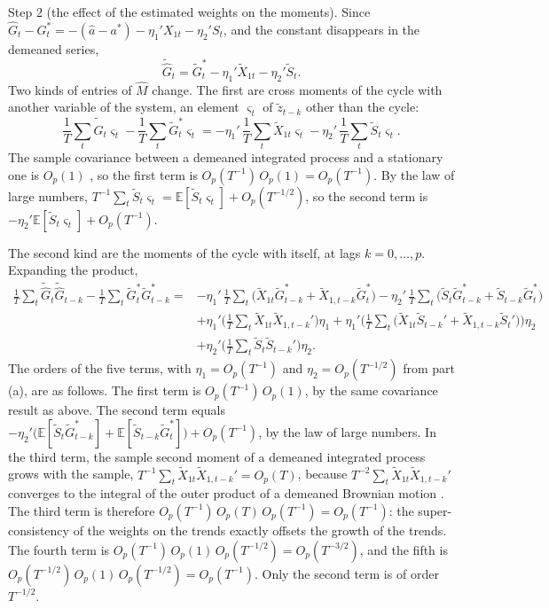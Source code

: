 \documentclass[12pt,a4paper]{article}
\theoremstyle{definition}
\theoremstyle{definition}\newtheorem{example}{Example}
\theoremstyle{definition}\newtheorem{definition}{Definition}
\newcommand{\E}{\mathbb{E}}
\begin{document}
Step 2 (the effect of the estimated weights on the moments). Since $\hat G_t-G^\ast_t=-(\hat a-a^\ast)-\eta_1'X_{1t}-\eta_2'S_t$, and the constant disappears in the demeaned series,
\[
\tilde{\hat G}_t=\tilde G^\ast_t-\eta_1'\tilde X_{1t}-\eta_2'\tilde S_t .
\]
Two kinds of entries of $\hat M$ change. The first are cross moments of the cycle with another variable of the system, an element $\varsigma_t$ of $\tilde z_{t-k}$ other than the cycle:
\[
\frac1T\sum_t\tilde{\hat G}_t\varsigma_t-\frac1T\sum_t\tilde G^\ast_t\varsigma_t=-\eta_1'\,\frac1T\sum_t\tilde X_{1t}\varsigma_t-\eta_2'\,\frac1T\sum_t\tilde S_t\varsigma_t .
\]
The sample covariance between a demeaned integrated process and a stationary one is $O_p(1)$ \citep{Phillips1988}, so the first term is $O_p(T^{-1})\,O_p(1)=O_p(T^{-1})$. By the law of large numbers, $T^{-1}\sum_t\tilde S_t\varsigma_t=\E[\tilde S_t\varsigma_t]+O_p(T^{-1/2})$, so the second term is $-\eta_2'\E[\tilde S_t\varsigma_t]+O_p(T^{-1})$.

The second kind are the moments of the cycle with itself, at lags $k=0,\dots,p$. Expanding the product,
\begin{align*}
\frac1T\sum_t\tilde{\hat G}_t\tilde{\hat G}_{t-k}-\frac1T\sum_t\tilde G^\ast_t\tilde G^\ast_{t-k}
={}&-\eta_1'\,\frac1T\sum_t\big(\tilde X_{1t}\tilde G^\ast_{t-k}+\tilde X_{1,t-k}\tilde G^\ast_t\big)
-\eta_2'\,\frac1T\sum_t\big(\tilde S_t\tilde G^\ast_{t-k}+\tilde S_{t-k}\tilde G^\ast_t\big)\\
&+\eta_1'\Big(\frac1T\sum_t\tilde X_{1t}\tilde X_{1,t-k}'\Big)\eta_1
+\eta_1'\Big(\frac1T\sum_t\big(\tilde X_{1t}\tilde S_{t-k}'+\tilde X_{1,t-k}\tilde S_t'\big)\Big)\eta_2\\
&+\eta_2'\Big(\frac1T\sum_t\tilde S_t\tilde S_{t-k}'\Big)\eta_2 .
\end{align*}
The orders of the five terms, with $\eta_1=O_p(T^{-1})$ and $\eta_2=O_p(T^{-1/2})$ from part (a), are as follows. The first term is $O_p(T^{-1})\,O_p(1)$, by the same covariance result as above. The second term equals $-\eta_2'\big(\E[\tilde S_t\tilde G^\ast_{t-k}]+\E[\tilde S_{t-k}\tilde G^\ast_t]\big)+O_p(T^{-1})$, by the law of large numbers. In the third term, the sample second moment of a demeaned integrated process grows with the sample, $T^{-1}\sum_t\tilde X_{1t}\tilde X_{1,t-k}'=O_p(T)$, because $T^{-2}\sum_t\tilde X_{1t}\tilde X_{1,t-k}'$ converges to the integral of the outer product of a demeaned Brownian motion \citep{Phillips1987}. The third term is therefore $O_p(T^{-1})\,O_p(T)\,O_p(T^{-1})=O_p(T^{-1})$: the super-consistency of the weights on the trends exactly offsets the growth of the trends. The fourth term is $O_p(T^{-1})\,O_p(1)\,O_p(T^{-1/2})=O_p(T^{-3/2})$, and the fifth is $O_p(T^{-1/2})\,O_p(1)\,O_p(T^{-1/2})=O_p(T^{-1})$. Only the second term is of order $T^{-1/2}$.
\end{document}
